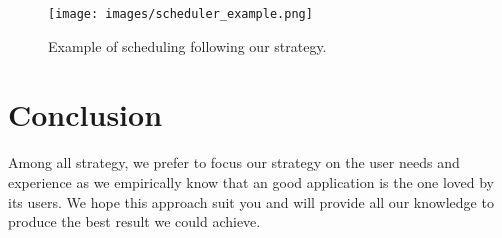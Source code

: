 \documentclass[a4paper,11pt]{article}
\begin{document}
\begin{center}
\begin{figure}[ht]
\texttt{[image: images/scheduler\_example.png]}
\caption{Example of scheduling following our strategy.}
\label{scheduling_example}
\end{figure}
\end{center}

\clearpage

\section{Conclusion}

Among all strategy, we prefer to focus our strategy on the user needs and experience as we empirically know that an good application is the one loved by its users. We hope this approach suit you and will provide all our knowledge to produce the best result we could achieve.

\newpage

\end{document}
